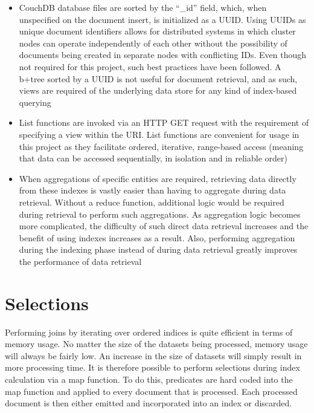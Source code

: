 \begin{itemize}
    \item CouchDB database files are sorted by the ``\_id'' field, which, when unspecified on the document insert, is initialized as a UUID. Using UUIDs as unique document identifiers allows for distributed systems in which cluster nodes can operate independently of each other without the possibility of documents being created in separate nodes with conflicting IDs. Even though not required for this project, such best practices have been followed. A b+tree sorted by a UUID is not useful for document retrieval, and as such, views are required of the underlying data store for any kind of index-based querying
    \item List functions are invoked via an HTTP GET request with the requirement of specifying a view within the URI. List functions are convenient for usage in this project as they facilitate ordered, iterative, range-based access (meaning that data can be accessed sequentially, in isolation and in reliable order)
    \item When aggregations of specific entities are required, retrieving data directly from these indexes is vastly easier than having to aggregate during data retrieval. Without a reduce function, additional logic would be required during retrieval to perform such aggregations. As aggregation logic becomes more complicated, the difficulty of such direct data retrieval increases and the benefit of using indexes increases as a result. Also, performing aggregation during the indexing phase instead of during data retrieval greatly improves the performance of data retrieval
\end{itemize}

\section{Selections}
Performing joins by iterating over ordered indices is quite efficient in terms of memory usage. No matter the size of the datasets being processed, memory usage will always be fairly low. An increase in the size of datasets will simply result in more processing time. It is therefore possible to perform selections during index calculation via a map function. To do this, predicates are hard coded into the map function and applied to every document that is processed. Each processed document is then either emitted and incorporated into an index or discarded.

